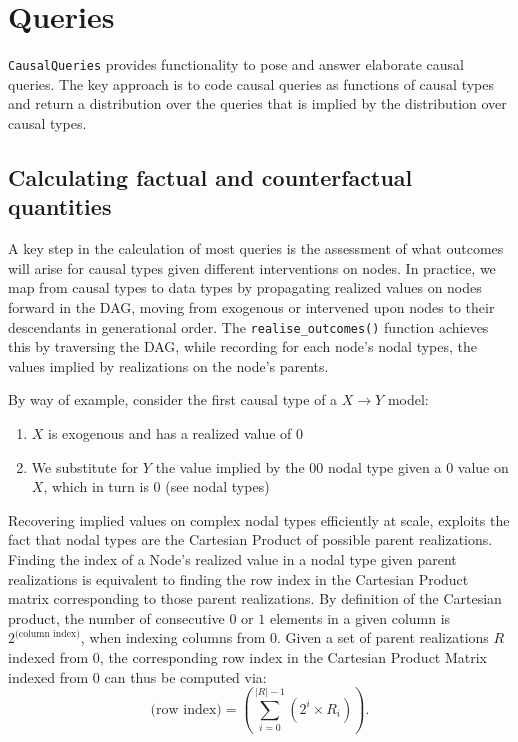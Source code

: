 \documentclass[
  11pt,
  article]{jss}
\providecommand{\tightlist}{%
  \setlength{\itemsep}{0pt}\setlength{\parskip}{0pt}}\usepackage{longtable,booktabs,array}
\begin{document}
\hypertarget{sec-query}{%
\section{Queries}\label{sec-query}}

\texttt{CausalQueries} provides functionality to pose and answer
elaborate causal queries. The key approach is to code causal queries as
functions of causal types and return a distribution over the queries
that is implied by the distribution over causal types.

\hypertarget{sec-propagation}{%
\subsection{Calculating factual and counterfactual
quantities}\label{sec-propagation}}

A key step in the calculation of most queries is the assessment of what
outcomes will arise for causal types given different interventions on
nodes. In practice, we map from causal types to data types by
propagating realized values on nodes forward in the DAG, moving from
exogenous or intervened upon nodes to their descendants in generational
order. The \texttt{realise\_outcomes()} function achieves this by
traversing the DAG, while recording for each node's nodal types, the
values implied by realizations on the node's parents.

By way of example, consider the first causal type of a
\(X \rightarrow Y\) model:

\begin{enumerate}
\def\labelenumi{\arabic{enumi}.}
\tightlist
\item
  \(X\) is exogenous and has a realized value of \(0\)
\item
  We substitute for \(Y\) the value implied by the \(00\) nodal type
  given a \(0\) value on \(X\), which in turn is \(0\) (see nodal types)
\end{enumerate}

Recovering implied values on complex nodal types efficiently at scale,
exploits the fact that nodal types are the Cartesian Product of possible
parent realizations. Finding the index of a Node's realized value in a
nodal type given parent realizations is equivalent to finding the row
index in the Cartesian Product matrix corresponding to those parent
realizations. By definition of the Cartesian product, the number of
consecutive \(0\) or \(1\) elements in a given column is
\(2^{\text{(column index)}}\), when indexing columns from \(0\). Given a
set of parent realizations \(R\) indexed from \(0\), the corresponding
row index in the Cartesian Product Matrix indexed from \(0\) can thus be
computed via:
\[\text{(row index)} = (\sum_{i = 0}^{|R| - 1} (2^{i} \times R_i)).\]
\end{document}

